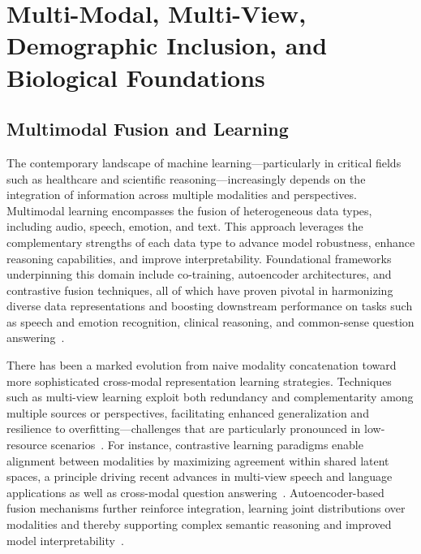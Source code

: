 \section{Multi-Modal, Multi-View, Demographic Inclusion, and Biological Foundations}

\subsection{Multimodal Fusion and Learning}

The contemporary landscape of machine learning—particularly in critical fields such as healthcare and scientific reasoning—increasingly depends on the integration of information across multiple modalities and perspectives. Multimodal learning encompasses the fusion of heterogeneous data types, including audio, speech, emotion, and text. This approach leverages the complementary strengths of each data type to advance model robustness, enhance reasoning capabilities, and improve interpretability. Foundational frameworks underpinning this domain include co-training, autoencoder architectures, and contrastive fusion techniques, all of which have proven pivotal in harmonizing diverse data representations and boosting downstream performance on tasks such as speech and emotion recognition, clinical reasoning, and common-sense question answering~\cite{ref79,ref31,ref36,ref46,ref47,ref48,ref49,ref50,ref55,ref60,ref74,ref75,ref80,ref87,ref88,ref89,ref90}.

There has been a marked evolution from naive modality concatenation toward more sophisticated cross-modal representation learning strategies. Techniques such as multi-view learning exploit both redundancy and complementarity among multiple sources or perspectives, facilitating enhanced generalization and resilience to overfitting—challenges that are particularly pronounced in low-resource scenarios~\cite{ref79}. For instance, contrastive learning paradigms enable alignment between modalities by maximizing agreement within shared latent spaces, a principle driving recent advances in multi-view speech and language applications as well as cross-modal question answering~\cite{ref31,ref79}. Autoencoder-based fusion mechanisms further reinforce integration, learning joint distributions over modalities and thereby supporting complex semantic reasoning and improved model interpretability~\cite{ref79,ref46,ref47}. 

